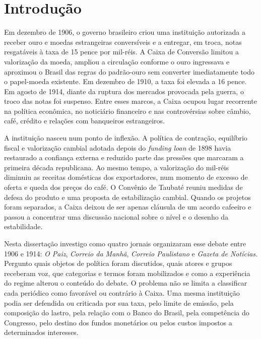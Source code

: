 \chapter*{Introdução}

Em dezembro de 1906, o governo brasileiro criou uma instituição autorizada a receber ouro e moedas estrangeiras conversíveis e a entregar, em troca, notas resgatáveis à taxa de 15 pence por mil-réis. A Caixa de Conversão limitou a valorização da moeda, ampliou a circulação conforme o ouro ingressava e aproximou o Brasil das regras do padrão-ouro sem converter imediatamente todo o papel-moeda existente. Em dezembro de 1910, a taxa foi elevada a 16 pence. Em agosto de 1914, diante da ruptura dos mercados provocada pela guerra, o troco das notas foi suspenso. Entre esses marcos, a Caixa ocupou lugar recorrente na política econômica, no noticiário financeiro e nas controvérsias sobre câmbio, café, crédito e relações com banqueiros estrangeiros.

A instituição nasceu num ponto de inflexão. A política de contração, equilíbrio fiscal e valorização cambial adotada depois do \textit{funding loan} de 1898 havia restaurado a confiança externa e reduzido parte das pressões que marcaram a primeira década republicana. Ao mesmo tempo, a valorização do mil-réis diminuiu as receitas domésticas dos exportadores, num momento de excesso de oferta e queda dos preços do café. O Convênio de Taubaté reuniu medidas de defesa do produto e uma proposta de estabilização cambial. Quando os projetos foram separados, a Caixa deixou de ser apenas cláusula de um acordo cafeeiro e passou a concentrar uma discussão nacional sobre o nível e o desenho da estabilidade.

Nesta dissertação investigo como quatro jornais organizaram esse debate entre 1906 e 1914: \textit{O Paiz}, \textit{Correio da Manhã}, \textit{Correio Paulistano} e \textit{Gazeta de Notícias}. Pergunto quais objetos de política foram discutidos, quais atores e grupos receberam voz, que categorias e termos foram mobilizados e como a experiência do regime alterou o conteúdo do debate. O problema não se limita a classificar cada periódico como favorável ou contrário à Caixa. Uma mesma instituição podia ser defendida ou criticada por sua taxa, pelo limite de emissão, pela composição do lastro, pela relação com o Banco do Brasil, pela competência do Congresso, pelo destino dos fundos monetários ou pelos custos impostos a determinados interesses.

